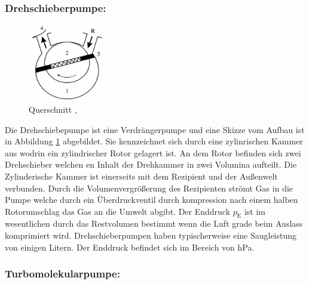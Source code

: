 \subsubsection{Drehschieberpumpe:}
\begin{figure}
    \vspace{-1cm}
    \centering
    \includegraphics[width=0.3\textwidth]{./picture/Drehschieberpumpe.png}
    \caption{Querschnitt \cite{Dreh},\cite{Jena}}
    \label{fig:Dreh}
\end{figure}
Die Drehschiebepumpe ist eine Verdrängerpumpe und eine Skizze vom Aufbau ist in Abbildung \ref{fig:Dreh} abgebildet. Sie kennzeichnet sich durch eine zylinrischen Kammer aus wodrin ein zylindrischer Rotor gelagert ist. An dem Rotor befinden sich zwei Drehschieber welchen en Inhalt der Drehkammer in zwei Volumina aufteilt. Die Zylinderische Kammer ist einerseits mit dem Rezipient und der Außenwelt verbunden. Durch die Volumenvergrößerung des Rezipienten strömt Gas in die Pumpe welche durch ein Überdruckventil durch kompression nach einem halben Rotorumschlag das Gas an die Umwelt abgibt. Der Enddruck $p_\text{E}$ ist im wesentlichen durch das Restvolumen bestimmt wenn die Luft grade beim Auslass komprimiert wird. Drehschieberpumpen haben typischerweise eine Saugleistung von einigen Litern. Der Enddruck befindet sich im Bereich von hPa. 


\subsubsection{Turbomolekularpumpe:}

